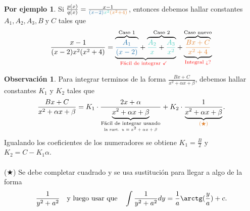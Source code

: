 \documentclass{article}
\theoremstyle{definition}
\theoremstyle{definition}
\newtheorem*{obs}{Observación}
\newtheorem*{ej}{Por ejemplo}
\theoremstyle{remark}
\newcommand\ok{\checkmark}
\begin{document}
\begin{ej}
  Si $\frac{p(x)}{q(x)}=\frac{x-1}{\textcolor{azulp2}{(x-2)}\textcolor{verdep2}{x^2}\textcolor{rojop2}{(x^2+4)}}$, entonces debemos hallar constantes $A_1, A_2, A_3, B \; \text{y} \; C$ tales que \[
\frac{x-1}{(x-2)x^2(x^2+4)}=
\underbrace{
{
\overbrace{
\textcolor{azulp2}{\frac{A_1}{(x-2)}}}^{\text{Caso 1}}
}+
\overbrace{\textcolor{verdep2}{\frac{A_2}{x}}
+
\textcolor{verdep2}{\frac{A_3}{x^2}}}^{\text{Caso 2}}}
_{\text{\textcolor{red}{Fácil de integrar $\ok$ }
}
}
+
\underbrace{
\overbrace{\textcolor{rojop2}{
\frac{Bx+C}{x^2+4}}}^{\text{Caso nuevo}}
}
_{\textcolor{red}{\text{Integral ¿?}
}
}
  \]
\end{ej}

\begin{obs}
Para integrar terminos de la forma $\frac{Bx+C}{x^2+\alpha x + \beta}$, debemos hallar constantes $K_1$ y $K_2$ tales que
\[
\frac{Bx+C}{x^2+\alpha x + \beta}
=
K_1 \cdot \frac{2x+\alpha}{\underbrace{x^2+\alpha x + \beta}_{\underset{\text{la sust. $u=x^2+\alpha x + \beta $}}{\text{Fácil de integrar usando}}}}
+
K_2 \cdot \frac{1}{\underbrace{x^2+\alpha x + \beta}_{\textcolor{rojop2}{(\bigstar)}}}.
\]
Igualando los coeficientes de los numeradores se obtiene $K_1=\frac{B}{2}$ y\\ $K_2=C-K_1 \alpha$. \\\\
\textcolor{rojop2}{($\bigstar$)} Se debe completar cuadrado y se usa sustitución para llegar a algo de la forma \[
\frac{1}{y^2+a^2} \quad \text{y luego usar que}\quad \int{\frac{1}{y^2+a^2}dy}=\frac{1}{a}\arctg(\frac{y}{a})+c.
\]
\end{obs}
\end{document}
